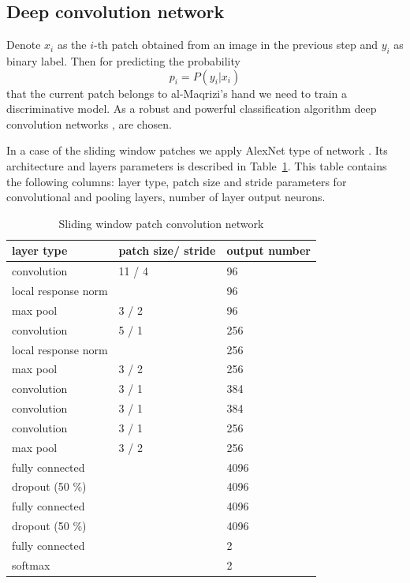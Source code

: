 \documentclass[conference,a4paper]{ieeetran}
\begin{document}
\subsection{Deep convolution network}

Denote $x_i$ as the $i$-th patch obtained from an image in the previous step and $y_i$ as binary label. Then for predicting the probability
\begin{equation*}
	p_i = P(y_i | x_i)
\end{equation*}
that the current patch belongs to al-Maqrizi's hand we need to train a discriminative model. As a robust and powerful classification algorithm deep convolution networks \cite{DL}, \cite{CNN} are chosen. 

In a case of the sliding window patches we apply AlexNet type of network \cite{Alexnet}. Its architecture and layers parameters is described in Table~\ref{alexnet_tab}. This table contains the following columns: layer type, patch size and stride parameters for convolutional and pooling layers, number of layer output neurons.%
\begin{table}[!b]
\centering
\caption{Sliding window patch convolution network}
\label{alexnet_tab}
\begin{tabular}{|l|p{1.3cm}|p{1.3cm}|}
\hline
\textbf{layer type} & \textbf{patch size/ stride} & \textbf{output number}  \\
\hline
convolution & 11 / 4 & 96 \\
\hline
local response norm & & 96 \\
\hline
max pool & 3 / 2 & 96 \\
\hline
convolution & 5 / 1 & 256 \\
\hline
local response norm & & 256 \\
\hline
max pool & 3 / 2 & 256 \\
\hline
convolution & 3 / 1 & 384 \\
\hline
convolution & 3 / 1 & 384 \\
\hline
convolution & 3 / 1 & 256 \\
\hline
max pool & 3 / 2 & 256 \\
\hline
fully connected & & 4096 \\
\hline
dropout (50 \%) & & 4096 \\
\hline
fully connected & & 4096 \\
\hline
dropout (50 \%) & & 4096 \\
\hline
fully connected & & 2 \\
\hline
softmax & & 2 \\
\hline
\end{tabular}
\end{table}
\end{document}
